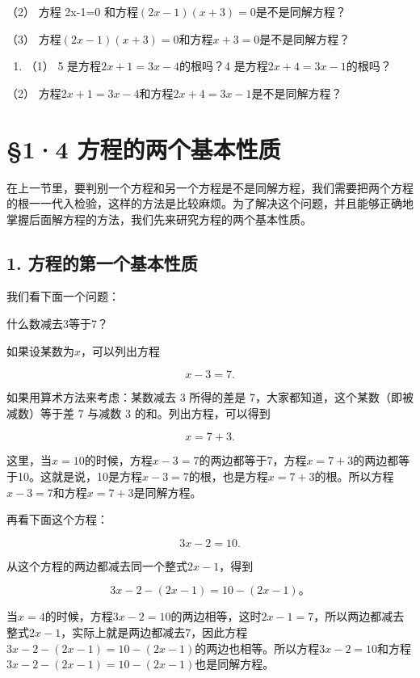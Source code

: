 （2） 方程 2x-1=0 和方程\((2x-1)(x+3)=0\)是不是同解方程？

（3） 方程\((2x-1)(x+3)=0\)和方程\(x+3=0\)是不是同解方程？

\begin{enumerate}[start=5]
\item
  （1） 5 是方程\(2x + 1 = 3x - 4\)的根吗？4
  是方程\(2x + 4 = 3x - 1\)的根吗？
\end{enumerate}

（2） 方程\(2x + 1 = 3x - 4\)和方程\(2x + 4 = 3x - 1\)是不是同解方程？

\section{§1·4 方程的两个基本性质}

在上一节里，要判别一个方程和另一个方程是不是同解方程，我们需要把两个方程的根一一代入检验，这样的方法是比较麻烦。为了解决这个问题，并且能够正确地掌握后面解方程的方法，我们先来研究方程的两个基本性质。

\subsection{1. 方程的第一个基本性质}

我们看下面一个问题：

什么数减去3等于7？

如果设某数为\(x\)，可以列出方程

\[
x - 3 = 7.
\]

如果用算术方法来考虑：某数减去 3 所得的差是
7，大家都知道，这个某数（即被减数）等于差 7 与减数 3
的和。列出方程，可以得到

\[
x = 7 + 3.
\]

这里，当\(x = 10\)的时候，方程\(x - 3 = 7\)的两边都等于7，方程\(x = 7 + 3\)的两边都等于10。这就是说，10是方程\(x - 3 = 7\)的根，也是方程\(x = 7 + 3\)的根。所以方程\(x - 3 = 7\)和方程\(x = 7 + 3\)是同解方程。

再看下面这个方程：

\[
3 x - 2 = 10.
\]

从这个方程的两边都减去同一个整式\(2x - 1\)，得到

\[
3 x - 2 - (2 x - 1) = 10 - (2 x - 1)\text{。}
\]

当\(x = 4\)的时候，方程\(3x - 2 = 10\)的两边相等，这时\(2x - 1 = 7\)，所以两边都减去整式\(2x - 1\)，实际上就是两边都减去7，因此方程\(3x - 2 - (2x - 1) = 10 - (2x - 1)\)的两边也相等。所以方程\(3x - 2 = 10\)和方程\(3x - 2 - (2x - 1) = 10 - (2x - 1)\)也是同解方程。

